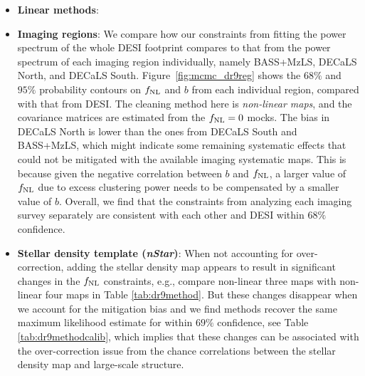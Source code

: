 \begin{itemize}[itemindent=*]

\item \textbf{Linear methods}:  
%
\item \textbf{Imaging regions}: We compare how our constraints from fitting the power spectrum of the whole DESI footprint compares to that from the power spectrum of each imaging region individually, namely BASS+MzLS, DECaLS North, and DECaLS South. Figure~\ref{fig:mcmc_dr9reg} shows the $68\%$ and $95\%$ probability contours on $f_{\rm NL}$ and $b$ from each individual region, compared with that from DESI. The cleaning method here is \textit{non-linear  maps}, and the covariance matrices are estimated from the $f_{\rm NL}=0$ mocks. The bias in DECaLS North is lower than the ones from DECaLS South and BASS+MzLS, which might indicate some remaining systematic effects that could not be mitigated with the available imaging systematic maps. This is because given the negative correlation between $b$ and $f_{\rm NL}$, a larger value of $f_{\rm NL}$ due to excess clustering power needs to be compensated by a smaller value of $b$. Overall, we find that the constraints from analyzing each imaging survey separately are consistent with each other and DESI within $68\%$ confidence. 

\item \textbf{Stellar density template (\textit{nStar})}: When not accounting for over-correction, adding the stellar density map appears to result in significant changes in the $f_{\rm NL}$ constraints, e.g., compare non-linear three maps with non-linear four maps in Table \ref{tab:dr9method}. But these changes disappear when we account for the mitigation bias and we find  methods recover the same maximum likelihood estimate for  within $69\%$ confidence, see Table \ref{tab:dr9methodcalib}, which implies that these changes can be associated with the over-correction issue from the chance correlations between the stellar density map and large-scale structure.


\end{itemize}
